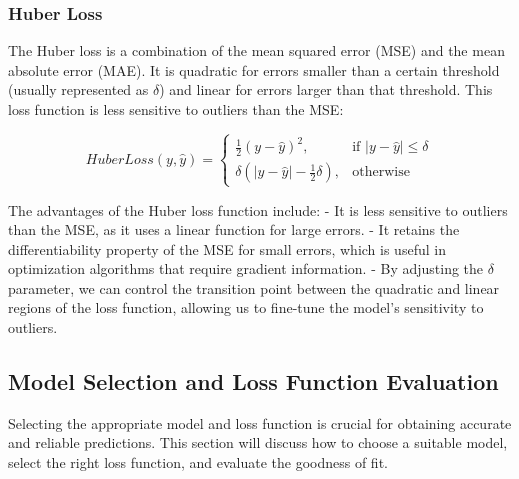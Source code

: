 \documentclass{article}
\begin{document}
\subsubsection{Huber Loss}
\begin{center}
\end{center}

The Huber loss is a combination of the mean squared error (MSE) and the mean absolute error (MAE). It is quadratic for errors smaller than a certain threshold (usually represented as $\delta$) and linear for errors larger than that threshold. This loss function is less sensitive to outliers than the MSE:

\begin{equation}
HuberLoss(y, \hat{y}) = \begin{cases}
\frac{1}{2}(y - \hat{y})^2, & \text{if } |y - \hat{y}| \le \delta \\
\delta(|y - \hat{y}| - \frac{1}{2}\delta), & \text{otherwise}
\end{cases}
\end{equation}

The advantages of the Huber loss function include:
- It is less sensitive to outliers than the MSE, as it uses a linear function for large errors.
- It retains the differentiability property of the MSE for small errors, which is useful in optimization algorithms that require gradient information.
- By adjusting the $\delta$ parameter, we can control the transition point between the quadratic and linear regions of the loss function, allowing us to fine-tune the model's sensitivity to outliers.

\subsection{Model Selection and Loss Function Evaluation}

Selecting the appropriate model and loss function is crucial for obtaining accurate and reliable predictions. This section will discuss how to choose a suitable model, select the right loss function, and evaluate the goodness of fit.
\end{document}
